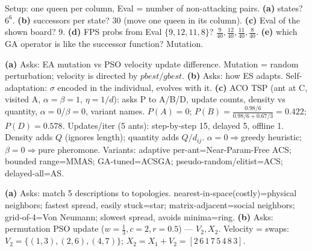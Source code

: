 Setup: one queen per column, Eval = number of non-attacking pairs. \textbf{(a)} states? \(6^6\). \textbf{(b)} successors per state? \(30\) (move one queen in its column). \textbf{(c)} Eval of the shown board? \(9\). \textbf{(d)} FPS probs from Eval \(\{9,12,11,8\}\)? \(\tfrac{9}{40},\tfrac{12}{40},\tfrac{11}{40},\tfrac{8}{40}\). \textbf{(e)} which GA operator is like the successor function? Mutation.

\textbf{(a)} Asks: EA mutation vs PSO velocity update difference. Mutation = random perturbation; velocity is directed by \(pbest/gbest\). \textbf{(b)} Asks: how ES adapts. Self-adaptation: \(\sigma\) encoded in the individual, evolves with it. \textbf{(c)} ACO TSP (ant at C, visited A, \(\alpha{=}\beta{=}1\), \(\eta{=}1/d\)): asks P to A/B/D, update counts, density vs quantity, \(\alpha{=}0\)/\(\beta{=}0\), variant names. \(P(A){=}0\); \(P(B){=}\tfrac{0.98/6}{0.98/6+0.67/3}{=}0.422\); \(P(D){=}0.578\). Updates/iter (5 ants): step-by-step 15, delayed 5, offline 1. Density adds \(Q\) (ignores length); quantity adds \(Q/d_{ij}\). \(\alpha{=}0\Rightarrow\)greedy heuristic; \(\beta{=}0\Rightarrow\)pure pheromone. Variants: adaptive per-ant=Near-Param-Free ACS; bounded range=MMAS; GA-tuned=ACSGA; pseudo-random/elitist=ACS; delayed-all=AS.

\textbf{(a)} Asks: match 5 descriptions to topologies. nearest-in-space(costly)=physical neighbors; fastest spread, easily stuck=star; matrix-adjacent=social neighbors; grid-of-4=Von Neumann; slowest spread, avoids minima=ring. \textbf{(b)} Asks: permutation PSO update (\(w{=}\tfrac13,c{=}2,r{=}0.5\)) --- \(V_2,X_2\). Velocity = swaps: \(V_2=\{(1,3),(2,6),(4,7)\}\); \(X_2=X_1{+}V_2=[2\,6\,1\,7\,5\,4\,8\,3]\).
